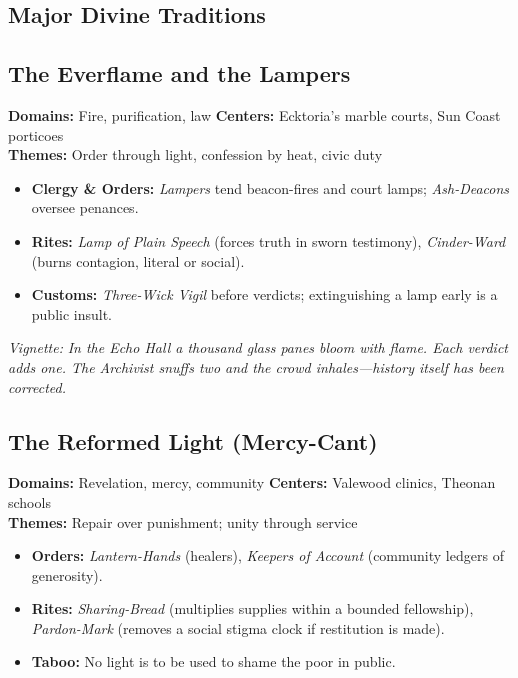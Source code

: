 \begin{multicols}{2}
\section{Major Divine Traditions}

\subsection*{The Everflame and the Lampers}
\textbf{Domains:} Fire, purification, law \quad
\textbf{Centers:} Ecktoria’s marble courts, Sun Coast porticoes \\
\textbf{Themes:} Order through light, confession by heat, civic duty
\begin{itemize}
  \item \textbf{Clergy \& Orders:} \emph{Lampers} tend beacon-fires and court lamps; \emph{Ash-Deacons} oversee penances. 
  \item \textbf{Rites:} \emph{Lamp of Plain Speech} (forces truth in sworn testimony), \emph{Cinder-Ward} (burns contagion, literal or social).
  \item \textbf{Customs:} \emph{Three-Wick Vigil} before verdicts; extinguishing a lamp early is a public insult. 
\end{itemize}
\emph{Vignette:} \textit{In the Echo Hall a thousand glass panes bloom with flame. Each verdict adds one. The Archivist snuffs two and the crowd inhales—history itself has been corrected.}

\subsection*{The Reformed Light (Mercy-Cant)}
\textbf{Domains:} Revelation, mercy, community \quad
\textbf{Centers:} Valewood clinics, Theonan schools \\
\textbf{Themes:} Repair over punishment; unity through service
\begin{itemize}
  \item \textbf{Orders:} \emph{Lantern-Hands} (healers), \emph{Keepers of Account} (community ledgers of generosity). 
  \item \textbf{Rites:} \emph{Sharing-Bread} (multiplies supplies within a bounded fellowship), \emph{Pardon-Mark} (removes a social stigma clock if restitution is made).
  \item \textbf{Taboo:} No light is to be used to shame the poor in public.
\end{itemize}


\end{multicols}
